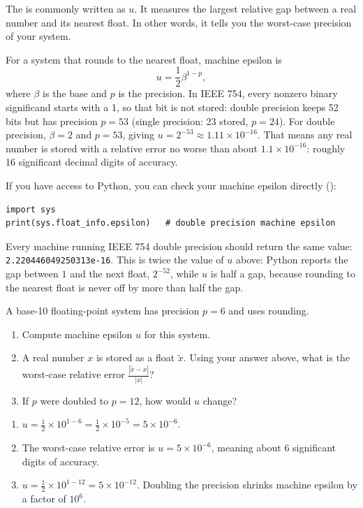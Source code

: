 The  is commonly written as $u$. It measures the largest relative gap between a real number and
its nearest float. In other words, it tells you the worst-case precision of your
system.

For a system that rounds to the nearest float, machine epsilon is
\[
    u = \frac{1}{2} \beta^{1-p},
\]
where $\beta$ is the base and $p$ is the precision. In IEEE 754, every nonzero binary significand starts with a 1, so that
bit is not stored: double precision keeps 52 bits but has precision $p = 53$
(single precision: 23 stored, $p = 24$). For double precision, $\beta = 2$ and
$p = 53$, giving $u = 2^{-53} \approx 1.11 \times 10^{-16}$. That means any
real number is stored with a relative error no worse than about $1.1 \times
10^{-16}$: roughly 16 significant decimal digits of accuracy.

If you have access to Python, you can check your machine epsilon directly ():

\begin{verbatim}
import sys
print(sys.float_info.epsilon)   # double precision machine epsilon
\end{verbatim}

Every machine running IEEE 754 double precision should return the same value:
\texttt{2.220446049250313e-16}. This is twice the value of $u$ above: Python reports the gap between $1$ and the next float, $2^{-52}$, while $u$ is half a gap, because rounding to the nearest float is never off by more than half the gap.

\begin{Exercise}[title={Machine Epsilon}, label={ex:machine}]
A base-10 floating-point system has precision $p = 6$ and uses rounding.
\begin{enumerate}
    \item Compute machine epsilon $u$ for this system.
    \item A real number $x$ is stored as a float $\tilde{x}$. Using your answer above,
    what is the worst-case relative error $\frac{|\tilde{x} - x|}{|x|}$?
    \item If $p$ were doubled to $p = 12$, how would $u$ change?
\end{enumerate}
\end{Exercise}
\begin{Answer}[ref={ex:machine}]
\begin{enumerate}
    \item $u = \frac{1}{2} \times 10^{1-6} = \frac{1}{2} \times 10^{-5} = 5 \times
    10^{-6}$.
    \item The worst-case relative error is $u = 5 \times 10^{-6}$, meaning about 6
    significant digits of accuracy.
    \item $u = \frac{1}{2} \times 10^{1-12} = 5 \times 10^{-12}$. Doubling the
    precision shrinks machine epsilon by a factor of $10^6$.
\end{enumerate}
\end{Answer}

